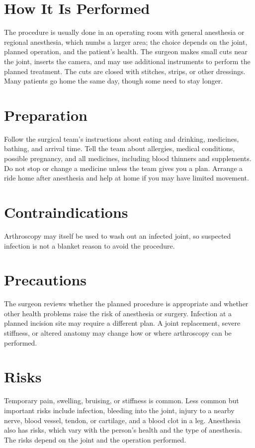 \section*{How It Is Performed}
The procedure is usually done in an operating room with general anesthesia or regional anesthesia, which numbs a larger area; the choice depends on the joint, planned operation, and the patient's health. The surgeon makes small cuts near the joint, inserts the camera, and may use additional instruments to perform the planned treatment. The cuts are closed with stitches, strips, or other dressings. Many patients go home the same day, though some need to stay longer.

\section*{Preparation}
Follow the surgical team's instructions about eating and drinking, medicines, bathing, and arrival time. Tell the team about allergies, medical conditions, possible pregnancy, and all medicines, including blood thinners and supplements. Do not stop or change a medicine unless the team gives you a plan. Arrange a ride home after anesthesia and help at home if you may have limited movement.

\section*{Contraindications}
Arthroscopy may itself be used to wash out an infected joint, so suspected infection is not a blanket reason to avoid the procedure.

\section*{Precautions}
The surgeon reviews whether the planned procedure is appropriate and whether other health problems raise the risk of anesthesia or surgery. Infection at a planned incision site may require a different plan. A joint replacement, severe stiffness, or altered anatomy may change how or where arthroscopy can be performed.

\section*{Risks}
Temporary pain, swelling, bruising, or stiffness is common. Less common but important risks include infection, bleeding into the joint, injury to a nearby nerve, blood vessel, tendon, or cartilage, and a blood clot in a leg. Anesthesia also has risks, which vary with the person's health and the type of anesthesia. The risks depend on the joint and the operation performed.

